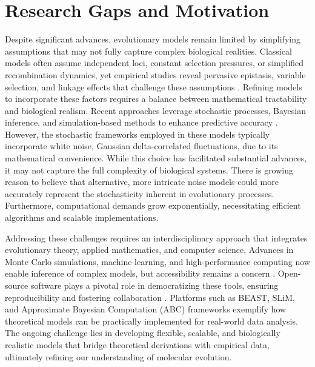 \section{Research Gaps and Motivation}
Despite significant advances, evolutionary models remain limited by simplifying assumptions that may not fully capture complex biological realities. Classical models often assume independent loci, constant selection pressures, or simplified recombination dynamics, yet empirical studies reveal pervasive epistasis, variable selection, and linkage effects that challenge these assumptions \cite{lunzer2010pervasive, neher2009competition}. Refining models to incorporate these factors requires a balance between mathematical tractability and biological realism. Recent approaches leverage stochastic processes, Bayesian inference, and simulation-based methods to enhance predictive accuracy \cite{csillery2010approximate, meyer2017accelerating}. However, the stochastic frameworks employed in these models typically incorporate white noise, Gaussian delta-correlated fluctuations, due to its mathematical convenience. While this choice has facilitated substantial advances, it may not capture the full complexity of biological systems. There is growing reason to believe that alternative, more intricate noise models could more accurately represent the stochasticity inherent in evolutionary processes. Furthermore, computational demands grow exponentially, necessitating efficient algorithms and scalable implementations.


Addressing these challenges requires an interdisciplinary approach that integrates evolutionary theory, applied mathematics, and computer science. Advances in Monte Carlo simulations, machine learning, and high-performance computing now enable inference of complex models, but accessibility remains a concern \cite{bryant2017special}. Open-source software plays a pivotal role in democratizing these tools, ensuring reproducibility and fostering collaboration \cite{bouckaert2014beast, haller2019slim}. Platforms such as BEAST, SLiM, and Approximate Bayesian Computation (ABC) frameworks exemplify how theoretical models can be practically implemented for real-world data analysis. The ongoing challenge lies in developing flexible, scalable, and biologically realistic models that bridge theoretical derivations with empirical data, ultimately refining our understanding of molecular evolution.



